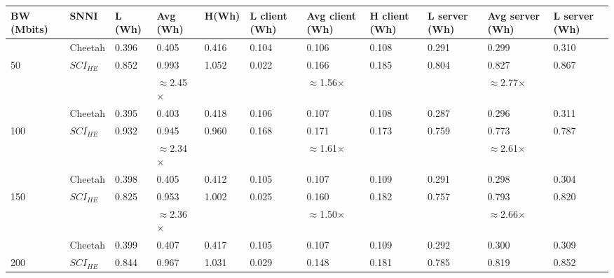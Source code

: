 \begin{tabular}{lllllllllll}
BW (Mbits) & SNNI    & L (Wh) & Avg (Wh) & H(Wh) & L client (Wh) & Avg client (Wh) & H client (Wh) & L server (Wh) & Avg server (Wh) & L server (Wh) \\ \hline
           & Cheetah & 0.396  & 0.405    & 0.416 & 0.104         & 0.106           & 0.108         & 0.291         & 0.299           & 0.310         \\
50         & $SCI_{HE}$ & 0.852  & 0.993    & 1.052 & 0.022         & 0.166           & 0.185         & 0.804         & 0.827           & 0.867         \\ \cline{3-11} 
           &         &        & $\approx$2.45$\times$    &       &               & $\approx$1.56$\times$           &               &               & $\approx$2.77$\times$           &               \\ \hline
           & Cheetah & 0.395  & 0.403    & 0.418 & 0.106         & 0.107           & 0.108         & 0.287         & 0.296           & 0.311         \\
100        & $SCI_{HE}$ & 0.932  & 0.945    & 0.960 & 0.168         & 0.171           & 0.173         & 0.759         & 0.773           & 0.787         \\ \cline{3-11} 
           &         &        & $\approx$2.34$\times$    &       &               & $\approx$1.61$\times$           &               &               & $\approx$2.61$\times$           &               \\ \hline
           & Cheetah & 0.398  & 0.405    & 0.412 & 0.105         & 0.107           & 0.109         & 0.291         & 0.298           & 0.304         \\
150        & $SCI_{HE}$ & 0.825  & 0.953    & 1.002 & 0.025         & 0.160           & 0.182         & 0.757         & 0.793           & 0.820         \\ \cline{3-11} 
           &         &        & $\approx$2.36$\times$    &       &               & $\approx$1.50$\times$           &               &               & $\approx$2.66$\times$          &               \\ \hline
           & Cheetah & 0.399  & 0.407    & 0.417 & 0.105         & 0.107           & 0.109         & 0.292         & 0.300           & 0.309         \\
200        & $SCI_{HE}$ & 0.844  & 0.967    & 1.031 & 0.029         & 0.148           & 0.181         & 0.785         & 0.819           & 0.852         \\ \cline{3-11} 

\end{tabular}
